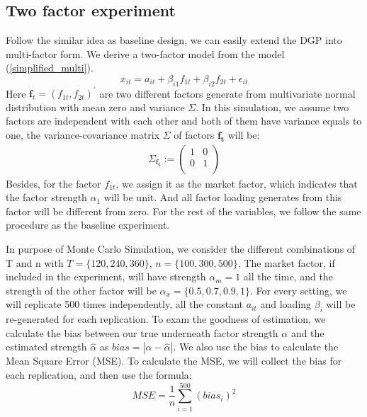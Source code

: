 \documentclass[12pt]{article}
\begin{document}
\subsection{Two factor experiment}
Follow the similar idea as baseline design, we can easily extend the DGP into multi-factor form. 
We derive a two-factor model from the model  (\ref{simplified_multi}).
	\[   x_{it} = a_{it} + \beta_{i1}f_{1t} + \beta_{i2}f_{2t}+\epsilon_{it}  \tag{8}  \]
Here $\mathbf{f}_t = (f_{1t}, f_{2t})^{\prime}$ are two different factors generate from multivariate normal distribution with mean zero and variance $\Sigma$.
In this simulation, we assume two factors are independent with each other and both of them have variance equals to one, the variance-covariance matrix $\Sigma$ of factors $\mathbf{f_t}$ will be:
\begin{align*}
\Sigma_{\mathbf{f_t}} := 
\begin{pmatrix}
1 &0\\
0 & 1 \\
\end{pmatrix}
\end{align*}
Besides, for the factor $f_{1t}$, we assign it as the market factor, which indicates that the factor strength $\alpha_1$ will be unit.
And all factor loading generates from this factor will be different from zero.
For the rest of the variables, we follow the same procedure as the baseline experiment.

In purpose of Monte Carlo Simulation, we consider the different combinations of T and n with $T = \{120, 240, 360\}$, $n =\{100, 300, 500\} $.
The market factor, if included in the experiment, will have strength $\alpha_m = 1$ all the time, and the strength of the other factor will be $\alpha_{x} = \{0.5, 0.7, 0.9,1\}$. For every setting, we will replicate 500 times independently, all the constant $a_{it}$ and loading $\beta_i$ will be re-generated for each replication.
To exam the goodness of estimation, we calculate the bias between our true underneath factor strength $\alpha$ and the estimated strength $\hat{\alpha}$ as $ bias = |\alpha - \hat{\alpha}|$. 
We also use the bias to calculate the Mean Square Error (MSE).
To calculate the MSE, we will collect the bias for each replication, and then use the formula: 
\[ MSE =\frac{1}{n}\sum_{i=1}^{500}(bias_i)^2 \]
\end{document}
